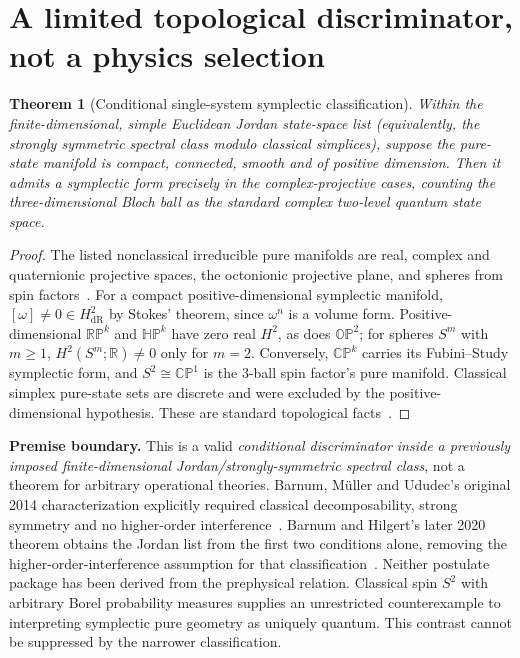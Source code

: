 \documentclass[10pt,letterpaper]{article}
\newtheorem{theorem}{Theorem}
\newcommand{\R}{\mathbb R}
\newcommand{\CP}{\mathbb{CP}}
\newcommand{\RP}{\mathbb{RP}}
\newcommand{\HP}{\mathbb{HP}}
\newcommand{\OP}{\mathbb{OP}}
\begin{document}
\section{A limited topological discriminator, not a physics selection}
\begin{theorem}[Conditional single-system symplectic classification]
Within the \emph{finite-dimensional, simple Euclidean Jordan state-space list} (equivalently, the strongly symmetric spectral class modulo classical simplices), suppose the pure-state manifold is compact, connected, smooth and of positive dimension. Then it admits a symplectic form precisely in the complex-projective cases, counting the three-dimensional Bloch ball as the standard complex two-level quantum state space.
\end{theorem}
\begin{proof}
The listed nonclassical irreducible pure manifolds are real, complex and quaternionic projective spaces, the octonionic projective plane, and spheres from spin factors~\cite{Barnum2014,BarnumHilgert2020}.  For a compact positive-dimensional symplectic manifold, $[\omega]\ne0\in H^2_{\mathrm{dR}}$ by Stokes' theorem, since $\omega^n$ is a volume form.  Positive-dimensional $\RP^{k}$ and $\HP^k$ have zero real $H^2$, as does $\OP^2$; for spheres $S^m$ with $m\ge1$, $H^2(S^m;\R)\ne0$ only for $m=2$.  Conversely, $\CP^k$ carries its Fubini--Study symplectic form, and $S^2\cong\CP^1$ is the $3$-ball spin factor's pure manifold.  Classical simplex pure-state sets are discrete and were excluded by the positive-dimensional hypothesis.  These are standard topological facts~\cite{ViaclovskyNotes}.
\end{proof}

\textbf{Premise boundary.} This is a valid \emph{conditional discriminator inside a previously imposed finite-dimensional Jordan/strongly-symmetric spectral class}, not a theorem for arbitrary operational theories.  Barnum, M\"uller and Ududec's original 2014 characterization explicitly required classical decomposability, strong symmetry and no higher-order interference~\cite{Barnum2014}.  Barnum and Hilgert's later 2020 theorem obtains the Jordan list from the first two conditions alone, removing the higher-order-interference assumption for that classification~\cite{BarnumHilgert2020}.  Neither postulate package has been derived from the prephysical relation.  Classical spin $S^2$ with arbitrary Borel probability measures supplies an unrestricted counterexample to interpreting symplectic pure geometry as uniquely quantum.  This contrast cannot be suppressed by the narrower classification.
\end{document}
